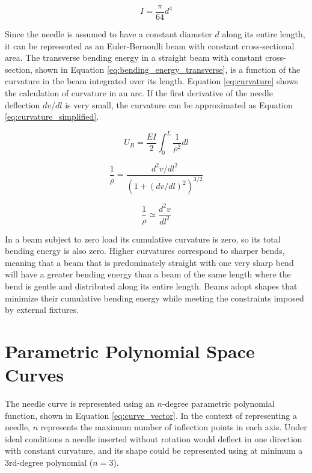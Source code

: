 \begin{equation}
\label{eq:beam_inertia}
I = \frac{\pi}{64}d^4
\end{equation}

Since the needle is assumed to have a constant diameter $d$ along its entire length, it can be represented as an Euler-Bernoulli beam with constant cross-sectional area. The transverse bending energy in a straight beam with constant cross-section, shown in Equation \ref{eq:bending_energy_transverse}, is a function of the curvature in the beam integrated over its length. Equation \ref{eq:curvature} shows the calculation of curvature in an arc. If the first derivative of the needle deflection $dv/dl$ is very small, the curvature can be approximated as Equation \ref{eq:curvature_simplified}.

\begin{equation}
\label{eq:bending_energy_transverse}
U_B = \frac{EI}{2}\int_{0}^{L}\frac{1}{\rho^2}dl
\end{equation}

\begin{equation}
\label{eq:curvature}
\frac{1}{\rho} = \frac{d^2v/dl^2}{(1+(dv/dl)^2)^{3/2}}
\end{equation}

\begin{equation}
\label{eq:curvature_simplified}
 \frac{1}{\rho} \simeq \frac{d^2v}{dl^2}
\end{equation}

In a beam subject to zero load its cumulative curvature is zero, so its total bending energy is also zero. Higher curvatures correspond to sharper bends, meaning that a beam that is predominately straight with one very sharp bend will have a greater bending energy than a beam of the same length where the bend is gentle and distributed along its entire length. Beams adopt shapes that minimize their cumulative bending energy while meeting the constraints imposed by external fixtures.

\section{Parametric Polynomial Space Curves}
The needle curve is represented using an $n$-degree parametric polynomial function, shown in Equation \ref{eq:curve_vector}. In the context of representing a needle, $n$ represents the maximum number of inflection points in each axis. Under ideal conditions a needle inserted without rotation would deflect in one direction with constant curvature, and its shape could be represented using at minimum a 3rd-degree polynomial ($n=3$).

